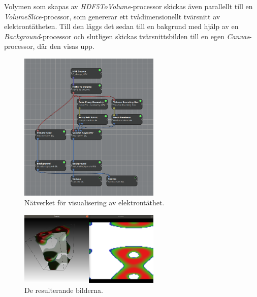 \documentclass[10pt,oneside,swedish]{article}
\begin{document}
Volymen som skapas av \emph{HDF5ToVolume}-processor skickas även
parallellt till en \emph{VolumeSlice}-procssor, som genererar ett
tvådimensionellt tvärsnitt av elektrontätheten. Till den läggs det sedan
till en bakgrund med hjälp av en \emph{Background}-processor och
slutligen skickas tvärsnittsbilden till en egen \emph{Canvas}-processor,
där den visas upp.

\begin{figure}[H]
\centering
\includegraphics[width=0.60000\textwidth]{Images/charge_network.png}
\caption{Nätverket för visualisering av elektrontäthet.}
\end{figure}

\begin{figure}[H]
\centering
\includegraphics[width=0.60000\textwidth]{Images/charge.png}
\caption{De resulterande bilderna.}
\end{figure}
\end{document}
